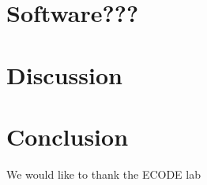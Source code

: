 \documentclass[sigconf]{acmart}
\begin{document}
\section{Software???}



\section{Discussion}



\section{Conclusion}

\begin{acks}
We would like to thank the ECODE lab
\end{acks}







\end{document}
